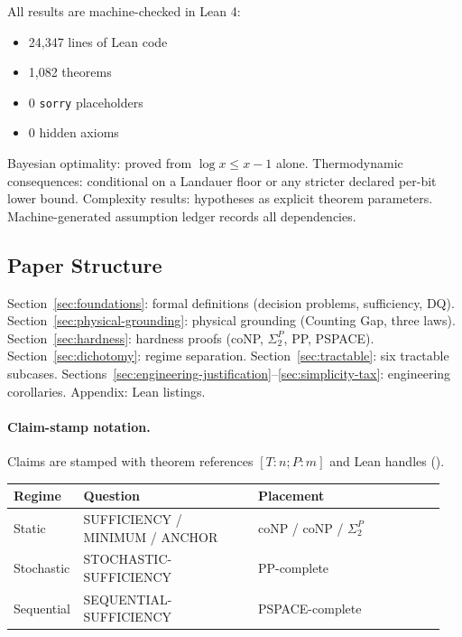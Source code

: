 All results are machine-checked in Lean 4:
\begin{itemize}
\item 24,347 lines of Lean code
\item 1,082 theorems
\item 0 \texttt{sorry} placeholders
\item 0 hidden axioms
\end{itemize}

Bayesian optimality: proved from $\log x \leq x - 1$ alone. Thermodynamic consequences: conditional on a Landauer floor or any stricter declared per-bit lower bound. Complexity results: hypotheses as explicit theorem parameters. Machine-generated assumption ledger records all dependencies.

\subsection{Paper Structure}\label{sec:intro-structure}

Section~\ref{sec:foundations}: formal definitions (decision problems, sufficiency, DQ).
Section~\ref{sec:physical-grounding}: physical grounding (Counting Gap, three laws).
Section~\ref{sec:hardness}: hardness proofs (coNP, $\Sigma_2^P$, PP, PSPACE).
Section~\ref{sec:dichotomy}: regime separation.
Section~\ref{sec:tractable}: six tractable subcases.
Sections~\ref{sec:engineering-justification}--\ref{sec:simplicity-tax}: engineering corollaries.
Appendix: Lean listings.

\paragraph{Claim-stamp notation.}
Claims are stamped with theorem references $[T:n; P:m]$ and Lean handles ().

\begingroup
\footnotesize
\noindent
\begin{tabularx}{\linewidth}{@{}>{\raggedright\arraybackslash}p{0.12\linewidth}>{\raggedright\arraybackslash}p{0.40\linewidth}>{\raggedright\arraybackslash}p{0.43\linewidth}@{}}
\toprule
\textbf{Regime} & \textbf{Question} & \textbf{Placement} \\
\midrule
Static & SUFFICIENCY / MINIMUM / ANCHOR & coNP / coNP / $\Sigma_2^P$ \\
Stochastic & STOCHASTIC-SUFFICIENCY & PP-complete \\
Sequential & SEQUENTIAL-SUFFICIENCY & PSPACE-complete \\
\bottomrule
\end{tabularx}
\endgroup

